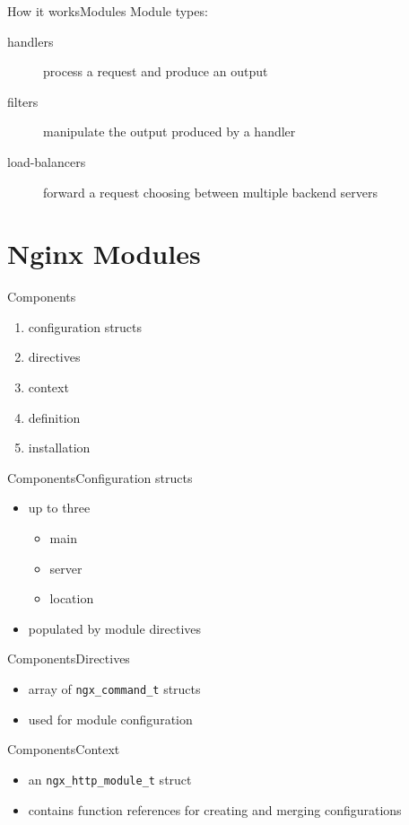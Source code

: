 \documentclass{beamer}
\begin{document}
\begin{frame}{How it works}{Modules}
Module types:
\begin{description}
 \item[handlers] process a request and produce an output
 \item[filters] manipulate the output produced by a handler
 \item[load-balancers] forward a request choosing between multiple backend servers
\end{description}
\end{frame}

\section{Nginx Modules}

\begin{frame}{Components}
 \begin{enumerate}
  \item configuration structs
  \item directives
  \item context
  \item definition
  \item installation
 \end{enumerate} 
\end{frame}

\begin{frame}{Components}{Configuration structs}
 \begin{itemize}
  \item up to three
  \begin{itemize}
   \item main
   \item server
   \item location
  \end{itemize}
  \item populated by module directives
 \end{itemize}
\end{frame}

\begin{frame}[fragile]{Components}{Directives}
 \begin{itemize}
  \item array of \verb|ngx_command_t| structs
  \item used for module configuration
 \end{itemize}
\end{frame}

\begin{frame}[fragile]{Components}{Context}
 \begin{itemize}
  \item an \verb|ngx_http_module_t| struct
  \item contains function references for creating and merging configurations
 \end{itemize}
\end{frame}
\end{document}
